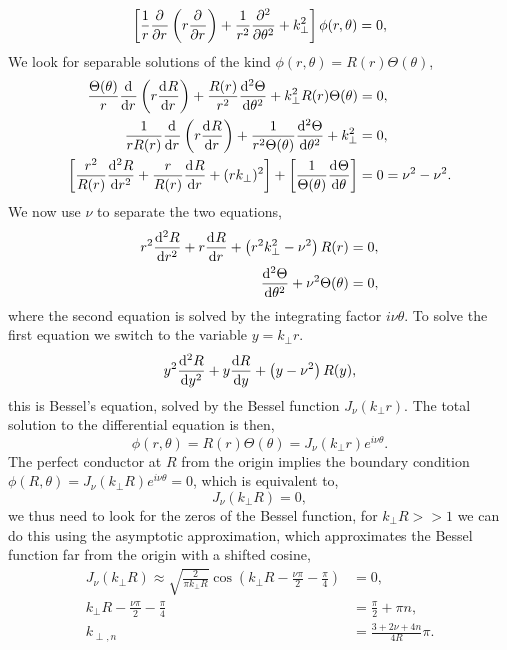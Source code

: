 \documentclass{article}
\begin{document}
\begin{equation*}
  \left[\frac{1}{r}\pdv[]{}{r}\left(r\pdv[]{}{r}\right)+\frac{1}{r^2}\pdv[2]{}{\theta}+k_{\perp}^2\right]\phi(r,\theta)=0,
\end{equation*}
We look for separable solutions of the kind $\phi(r,\theta)=R(r)\Theta(\theta)$,
\begin{align*}
  \frac{\Theta(\theta)}{r}\dv[]{}{r}\left(r\dv[]{R}{r}\right)+\frac{R(r)}{r^2}\dv[2]{\Theta}{\theta}+k_{\perp}^2R(r)\Theta(\theta)&=0,\\
  \frac{1}{rR(r)}\dv[]{}{r}\left(r\dv[]{R}{r}\right)+\frac{1}{r^2\Theta(\theta)}\dv[2]{\Theta}{\theta}+k_{\perp}^2&=0,\\
  \left[\frac{r^2}{R(r)}\dv[2]{R}{r}+\frac{r}{R(r)}\dv[]{R}{r}+(rk_{\perp})^2\right]+\left[\frac{1}{\Theta(\theta)}\dv[]{\Theta}{\theta}\right]&=0=\nu^2-\nu^2.
\end{align*}
We now use $\nu$ to separate the two equations,
\begin{align*}
  r^2\dv[2]{R}{r}+r\dv[]{R}{r}+\left(r^2k_{\perp}^2-\nu^2\right)R(r)&=0,\\
  \dv[2]{\Theta}{\theta}+\nu^2\Theta(\theta)&=0,
\end{align*}
where the second equation is solved by the integrating factor $i\nu\theta$. To solve the first equation we switch to the variable $y=k_{\perp}r$.
\begin{equation*}
  y^2\dv[2]{R}{y}+y\dv{R}{y}+\left(y-\nu^2\right)R(y),
\end{equation*}
this is Bessel's equation, solved by the Bessel function $J_\nu(k_{\perp}r)$. The total solution to the differential equation is then,
\begin{equation*}
  \phi(r,\theta)=R(r)\Theta(\theta)=J_\nu(k_{\perp}r)e^{i\nu\theta}.
\end{equation*}
The perfect conductor at $R$ from the origin implies the boundary condition $\phi(R,\theta)=J_\nu(k_{\perp}R)e^{i\nu\theta}=0$, which is equivalent to,
\begin{equation*}
  J_\nu(k_{\perp}R)=0,
\end{equation*}
we thus need to look for the zeros of the Bessel function, for $k_{\perp}R >> 1$ we can do this using the asymptotic approximation, which approximates the Bessel function far from the origin with a shifted cosine,
\begin{align*}
  J_\nu(k_{\perp}R)\approx\sqrt{\frac{2}{\pi k_{\perp}R}}\cos\left(k_{\perp}R-\frac{\nu\pi}{2}-\frac{\pi}{4}\right)&=0,\\
  k_{\perp}R-\frac{\nu\pi}{2}-\frac{\pi}{4}&=\frac{\pi}{2}+\pi n,\\
  k_{\perp,n}&=\frac{3+2\nu+4n}{4R}\pi.
\end{align*}
\end{document}
